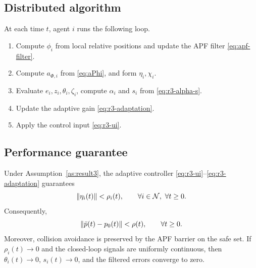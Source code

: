 \subsection{Distributed algorithm}

At each time $t$, agent $i$ runs the following loop.
\begin{enumerate}
    \item Compute $\phi_i$ from local relative positions and update the APF
    filter \eqref{eq:apf-filter}.

    \item Compute $a_{\Phi,i}$ from \eqref{eq:aPhi}, and form
    $\eta_i,\chi_i$.

    \item Evaluate $e_i,z_i,\theta_i,\zeta_i$, compute $\alpha_i$ and
    $s_i$ from \eqref{eq:r3-alpha-s}.

    \item Update the adaptive gain \eqref{eq:r3-adaptation}.

    \item Apply the control input \eqref{eq:r3-ui}.
\end{enumerate}

\subsection{Performance guarantee}

\begin{theorem}
\label{thm:result3}
Under Assumption~\ref{as:result3}, the adaptive controller
\eqref{eq:r3-ui}--\eqref{eq:r3-adaptation} guarantees
\[
\lVert \eta_i(t) \rVert<\rho_i(t),\qquad \forall i\in\mathcal{N},\ \forall t\ge0.
\]
Consequently,
\[
\lVert \bar p(t)-p_0(t) \rVert<\rho(t),\qquad \forall t\ge0.
\]
Moreover, collision avoidance is preserved by the APF barrier on the safe
set.  If $\rho_i(t)\to0$ and the closed-loop signals are uniformly
continuous, then $\theta_i(t)\to0$, $s_i(t)\to0$, and the filtered errors
converge to zero.
\end{theorem}

